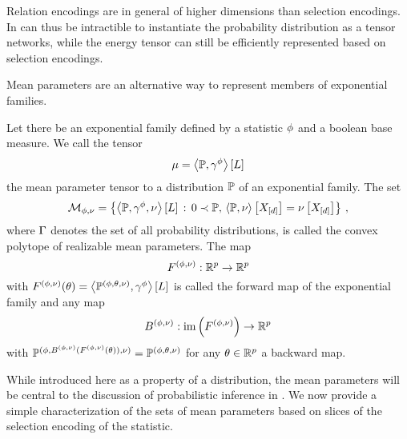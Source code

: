 \begin{remark}
    Relation encodings are in general of higher dimensions than selection encodings.
    In can thus be intractible to instantiate the probability distribution as a tensor networks, while the energy tensor can still be efficiently represented based on selection encodings.
\end{remark}






Mean parameters are an alternative way to represent members of exponential families.

\begin{definition}
    \label{def:meanForwardBackward}
    Let there be an exponential family defined by a statistic $\phi$ and a boolean base measure.
    We call the tensor
    \[ \mu = \left\langle \mathbb{P},\gamma^{\phi}\right\rangle \left[ L \right] \]
    the mean parameter tensor to a distribution $\mathbb{P}$ of an exponential family.
    The set
    \[ \mathcal{M}_{\phi,\nu} = \left\{\left\langle \mathbb{P},\gamma^{\phi},\nu\right\rangle \left[ L \right] \, : \, 0\prec\mathbb{P} , \, \left\langle \mathbb{P},\nu\right\rangle \left[ X_{[d]} \right]
    = \nu\left[X_{[d]}\right] \right\} \, , \]
    where $\Gamma$ denotes the set of all probability distributions,
    is called the convex polytope of realizable mean parameters.
    The map
    \[ F^{(\phi,\nu)} :  \mathbb{R}^{p}\rightarrow\mathbb{R}^{p}\]
    with $F^{(\phi,\nu)}(\theta) = \left\langle \mathbb{P}^{(\phi,\theta,\nu)},\gamma^{\phi}\right\rangle \left[ L \right]$ is called the forward map of the exponential family and any map
    \[ B^{(\phi,\nu)} : \mathrm{im}\left(F^{(\phi,\nu)}\right) \rightarrow \mathbb{R}^{p}\]
    with $\mathbb{P}^{(\phi,B^{(\phi,\nu)}(F^{(\phi,\nu)}(\theta)),\nu)} = \mathbb{P}^{(\phi,\theta,\nu)}$ for any $\theta\in\mathbb{R}^{p}$ a backward map.
\end{definition}


While introduced here as a property of a distribution, the mean parameters will be central to the discussion of probabilistic inference in .
We now provide a simple characterization of the sets of mean parameters based on slices of the selection encoding of the statistic.

